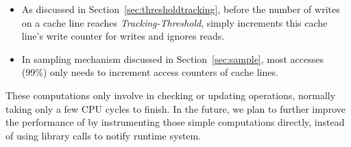 \begin{itemize}
\item
As discussed in Section~\ref{sec:thresholdtracking}, 
before the number of writes on a cache line reaches {\it Tracking-Threshold}, 
\Predator{} simply increments this cache line's write counter for writes
and ignores reads.
\item
In sampling mechanism discussed in Section~\ref{sec:sample}, 
most accesses (99\%) only needs to increment access counters of cache lines.
\end{itemize}

These computations only involve in checking or updating operations,
normally taking only a few CPU cycles to finish. 
In the future, we plan to further improve the performance of \Predator{} 
by instrumenting those simple computations directly, 
instead of using library calls to notify runtime system.

